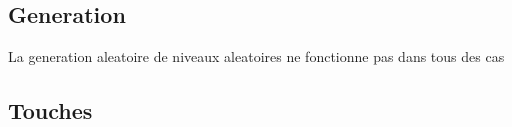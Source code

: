 \documentclass[../main.tex]{subfiles}
\begin{document}
\subsection{Generation}
La generation aleatoire de niveaux aleatoires ne fonctionne pas dans tous des cas
\subsection{Touches}
\end{document}
